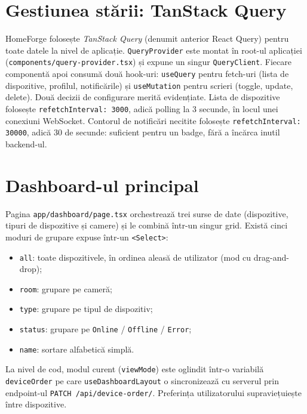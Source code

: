 \section{Gestiunea stării: TanStack Query}
HomeForge folosește \textit{TanStack Query} (denumit anterior React Query) pentru toate datele la nivel de aplicație. \texttt{QueryProvider} este montat în root-ul aplicației (\texttt{components/query-provider.tsx}) și expune un singur \texttt{QueryClient}. Fiecare componentă apoi consumă două hook-uri: \texttt{useQuery} pentru fetch-uri (lista de dispozitive, profilul, notificările) și \texttt{useMutation} pentru scrieri (toggle, update, delete). Două decizii de configurare merită evidențiate. Lista de dispozitive folosește \texttt{refetchInterval: 3000}, adică polling la 3 secunde, în locul unei conexiuni WebSocket. Contorul de notificări necitite folosește \texttt{refetchInterval: 30000}, adică 30 de secunde: suficient pentru un badge, fără a încărca inutil backend-ul.

\section{Dashboard-ul principal}
Pagina \texttt{app/dashboard/page.tsx} orchestrează trei surse de date (dispozitive, tipuri de dispozitive și camere) și le combină într-un singur grid. Există cinci moduri de grupare expuse într-un \texttt{<Select>}:
\begin{itemize}
    \item \texttt{all}: toate dispozitivele, în ordinea aleasă de utilizator (mod cu drag-and-drop);
    \item \texttt{room}: grupare pe cameră;
    \item \texttt{type}: grupare pe tipul de dispozitiv;
    \item \texttt{status}: grupare pe \texttt{Online} / \texttt{Offline} / \texttt{Error};
    \item \texttt{name}: sortare alfabetică simplă.
\end{itemize}
La nivel de cod, modul curent (\texttt{viewMode}) este oglindit într-o variabilă \texttt{deviceOrder} pe care \texttt{useDashboardLayout} o sincronizează cu serverul prin endpoint-ul \texttt{PATCH /api/device-order/}. Preferința utilizatorului supraviețuiește între dispozitive.

